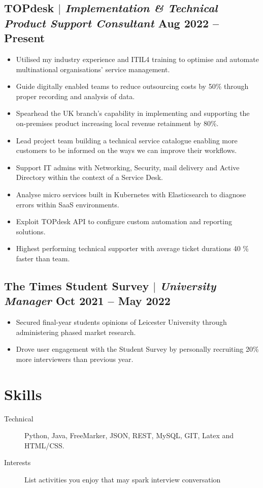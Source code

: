 \documentclass[10pt]{article}
\begin{document}
\subsection{TOPdesk $|$ {\small\normalfont\textit{Implementation \& Technical Product Support Consultant}} \small\hfill Aug 2022 -- Present}
\begin{itemize}
    \item Utilised my industry experience and ITIL4 training to optimise and automate multinational organisations' service management. 
    \item Guide digitally enabled teams to reduce outsourcing costs by 50\% through proper recording and analysis of data.
    \item Spearhead the UK branch's capability in implementing and supporting the on-premises product increasing local revenue retainment  by 80\%.
    \item Lead project team building a technical service catalogue enabling more customers to be informed on the ways we can improve their workflows.
    \item Support IT admins with Networking, Security, mail delivery and Active Directory within the context of a Service Desk.
    \item Analyse micro services built in Kubernetes with Elasticsearch to diagnose errors within SaaS environments.
    \item Exploit TOPdesk API to configure custom automation and reporting solutions.
    \item Highest performing technical supporter with average ticket durations 40 \% faster than team. 
    
\end{itemize}

\subsection{The Times Student Survey $|$ {\small\normalfont\textit{University Manager}} \small\hfill Oct 2021 -- May 2022}
\begin{itemize}
    \item Secured final-year students opinions of Leicester University through administering phased market research.
    \item Drove user engagement with the Student Survey by personally recruiting 20\% more interviewers than previous year. 
\end{itemize}

\section{Skills}
\begin{description}
    \item[Technical] Python, Java, FreeMarker, JSON, REST, MySQL, GIT, Latex and HTML/CSS. 
    \item[Interests] List activities you enjoy that may spark interview conversation
\end{description}
\end{document}
